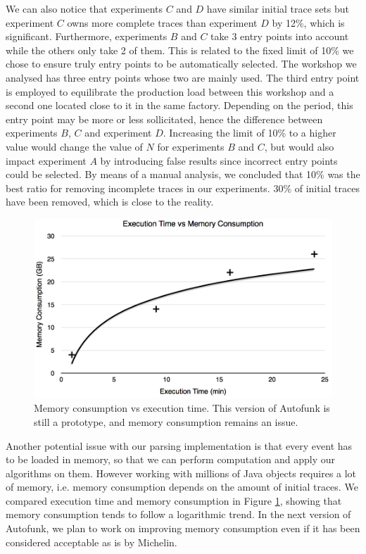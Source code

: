 We can also notice that experiments $C$ and $D$ have similar
initial trace sets but experiment $C$ owns more complete traces
than experiment $D$ by 12\%, which is significant. Furthermore, experiments
$B$ and $C$ take 3 entry points into account while the others only
take 2 of them. This is related to the fixed limit of 10\% we
chose to ensure truly entry points to be automatically selected.
The workshop we analysed has three entry points whose two are
mainly used. The third entry point is employed to equilibrate the
production load between this workshop and a second one located
close to it in the same factory. Depending on the period, this
entry point may be more or less sollicitated, hence the
difference between experiments $B$, $C$ and experiment $D$.
Increasing the limit of 10\% to a higher value would change the value
of $N$ for experiments $B$ and $C$, but would also impact
experiment $A$ by introducing false results since incorrect entry
points could be selected. By means of a manual analysis, we
concluded that 10\% was the best ratio for removing incomplete
traces in our experiments.  30\% of initial traces have been
removed, which is close to the reality.

\begin{figure}[ht]
  \includegraphics[width=1.0\linewidth]{figures/memory-time.png}

  \caption{Memory consumption vs execution time. This version of
  Autofunk is still a prototype, and memory consumption remains
  an issue.}
  \label{fig:memory-time}
\end{figure}

Another potential issue with our parsing implementation is that
every event has to be loaded in memory, so that we can perform
computation and apply our algorithms on them. However working
with millions of Java objects requires a lot of memory, i.e.
memory consumption depends on the amount of initial traces. We
compared execution time and memory consumption in Figure
\ref{fig:memory-time}, showing that memory consumption tends to
follow a logarithmic trend. In the next version of Autofunk, we
plan to work on improving memory consumption even if it has been
considered acceptable as is by Michelin.

